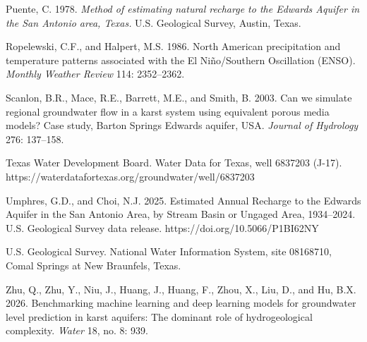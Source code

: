 \documentclass[11pt]{article}
\begin{document}
Puente, C. 1978. \emph{Method of estimating natural recharge to the
Edwards Aquifer in the San Antonio area, Texas.} U.S. Geological Survey,
Austin, Texas.

Ropelewski, C.F., and Halpert, M.S. 1986. North American precipitation
and temperature patterns associated with the El Ni\~no/Southern
Oscillation (ENSO). \emph{Monthly Weather Review} 114: 2352--2362.

Scanlon, B.R., Mace, R.E., Barrett, M.E., and Smith, B. 2003. Can we
simulate regional groundwater flow in a karst system using equivalent
porous media models? Case study, Barton Springs Edwards aquifer, USA.
\emph{Journal of Hydrology} 276: 137--158.

Texas Water Development Board. Water Data for Texas, well 6837203
(J-17). https://waterdatafortexas.org/groundwater/well/6837203

Umphres, G.D., and Choi, N.J. 2025. Estimated Annual Recharge to the
Edwards Aquifer in the San Antonio Area, by Stream Basin or Ungaged
Area, 1934--2024. U.S. Geological Survey data release.
https://doi.org/10.5066/P1BI62NY

U.S. Geological Survey. National Water Information System, site
08168710, Comal Springs at New Braunfels, Texas.

Zhu, Q., Zhu, Y., Niu, J., Huang, J., Huang, F., Zhou, X., Liu, D., and
Hu, B.X. 2026. Benchmarking machine learning and deep learning models
for groundwater level prediction in karst aquifers: The dominant role of
hydrogeological complexity. \emph{Water} 18, no. 8: 939.
\end{document}
